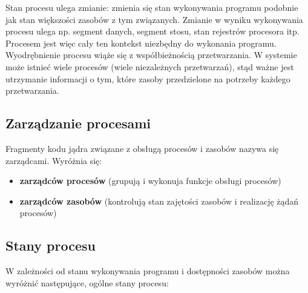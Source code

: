 \documentclass[12pt]{article}
\begin{document}
    Stan procesu ulega zmianie: zmienia się stan wykonywania programu podobnie jak stan większości zasobów z tym związanych. Zmianie w wyniku wykonywania procesu ulega np. segment danych, segment stosu, stan rejestrów procesora itp. Procesem jest więc cały ten kontekst niezbędny do wykonania programu. Wyodrębnienie procesu wiąże się z współbieżnością przetwarzania. W systemie może istnieć wiele procesów (wiele niezależnych przetwarzań), stąd ważne jest utrzymanie informacji o tym, które zasoby przedzielone na potrzeby każdego przetwarzania.
    
    \subsection{Zarządzanie procesami}
    
    Fragmenty kodu jądra związane z obsługą procesów i zasobów nazywa się zarządcami.
    Wyróżnia się:
    \begin{itemize}
        \item \textbf{zarządców procesów} (grupują i wykonuja funkcje obsługi procesów)
        \item \textbf{zarządców zasobów} (kontrolują stan zajętości zasobów i realizację żądań procesów)
    \end{itemize}
    
    \subsection{Stany procesu}
    
    W zależności od stanu wykonywania programu i dostępności zasobów można wyróżnić następujące, ogólne stany procesu:
\end{document}
